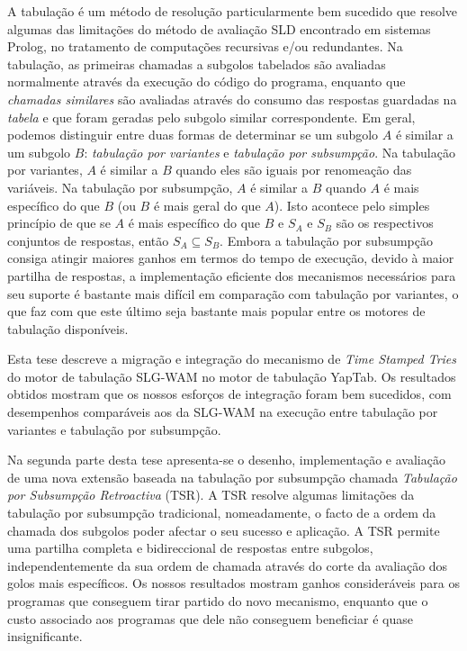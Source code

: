 A tabulação é um método de resolução particularmente bem sucedido que resolve algumas das limitações
do método de avaliação SLD encontrado em sistemas Prolog, no tratamento de computações recursivas e/ou redundantes.
Na tabulação, as primeiras chamadas a subgolos tabelados são avaliadas normalmente através da execução do código do
programa, enquanto que \emph{chamadas similares} são avaliadas através do consumo das respostas guardadas
na \emph{tabela} e que foram geradas pelo subgolo similar correspondente.
Em geral, podemos distinguir entre duas formas de determinar se um subgolo $A$ é similar a um subgolo $B$:
\emph{tabulação por variantes} e \emph{tabulação por subsumpção}.
Na tabulação por variantes, $A$ é similar a $B$ quando eles são iguais por renomeação das variáveis.
Na tabulação por subsumpção, $A$ é similar a $B$ quando $A$ é mais específico do que $B$ (ou $B$ é mais geral do que $A$).
Isto acontece pelo simples princípio de que se $A$ é mais específico do que $B$ e $S_A$ e $S_B$ são os respectivos
conjuntos de respostas, então $S_A \subseteq S_B$.
Embora a tabulação por subsumpção consiga atingir maiores ganhos em termos do tempo de execução, devido
à maior partilha de respostas, a implementação eficiente dos mecanismos necessários para seu suporte é bastante
mais difícil em comparação com tabulação por variantes, o que faz com que este último seja bastante mais popular
entre os motores de tabulação disponíveis.

Esta tese descreve a migração e integração do mecanismo de \emph{Time Stamped Tries} do motor de tabulação
SLG-WAM no motor de tabulação YapTab. Os resultados obtidos mostram que os nossos esforços de integração foram
bem sucedidos, com desempenhos comparáveis aos da SLG-WAM na execução entre tabulação por variantes e tabulação
por subsumpção.

Na segunda parte desta tese apresenta-se o desenho, implementação e avaliação de uma nova extensão baseada na tabulação
por subsumpção chamada \emph{Tabulação por Subsumpção Retroactiva} (TSR). A TSR resolve algumas limitações da
tabulação por subsumpção tradicional, nomeadamente, o facto de a ordem da chamada dos subgolos poder afectar o seu sucesso e
aplicação. A TSR permite uma partilha completa e bidireccional de respostas entre subgolos, independentemente da
sua ordem de chamada através do corte da avaliação dos golos mais específicos.
Os nossos resultados mostram ganhos consideráveis para os programas que conseguem tirar partido do novo mecanismo,
enquanto que o custo associado aos programas que dele não conseguem beneficiar é quase insignificante.
